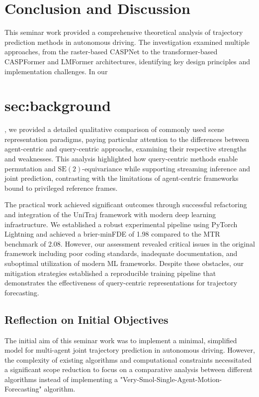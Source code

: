\section{Conclusion and Discussion}
\label{sec:conclusion}
This seminar work provided a comprehensive theoretical analysis of trajectory prediction methods in autonomous driving. The investigation examined multiple approaches, from the raster-based CASPNet to the transformer-based CASPFormer and LMFormer architectures, identifying key design principles and implementation challenges. In our \section{sec:background}, we provided a detailed qualitative comparison of commonly used scene representation paradigms, paying particular attention to the differences between agent-centric and query-centric approachs, examining their respective strengths and weaknesses. This analysis highlighted how query-centric methods enable permutation and $\mathrm{SE}(2)$-equivariance while supporting streaming inference and joint prediction, contrasting with the limitations of agent-centric frameworks bound to privileged reference frames.

The practical work achieved significant outcomes through successful refactoring and integration of the UniTraj framework with modern deep learning infrastructure. We established a robust experimental pipeline using PyTorch Lightning and achieved a brier-minFDE of 1.98 compared to the MTR benchmark of 2.08. However, our assessment revealed critical issues in the original framework including poor coding standards, inadequate documentation, and suboptimal utilization of modern ML frameworks. Despite these obstacles, our mitigation strategies established a reproducible training pipeline that demonstrates the effectiveness of query-centric representations for trajectory forecasting.


\subsection{Reflection on Initial Objectives}
\label{sec:conclusion_objectives}

The initial aim of this seminar work was to implement a minimal, simplified model for multi-agent joint trajectory prediction in autonomous driving. However, the complexity of existing algorithms and computational constraints necessitated a significant scope reduction to focus on a comparative analysis between different algorithms instead of implementing a "Very-Smol-Single-Agent-Motion-Forecasting" algorithm.

